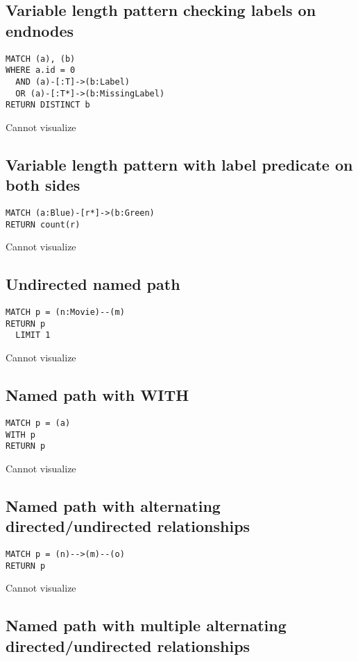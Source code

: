 \subsection{Variable length pattern checking labels on endnodes}

\begin{lstlisting}
MATCH (a), (b)
WHERE a.id = 0
  AND (a)-[:T]->(b:Label)
  OR (a)-[:T*]->(b:MissingLabel)
RETURN DISTINCT b
\end{lstlisting}

Cannot visualize
\subsection{Variable length pattern with label predicate on both sides}

\begin{lstlisting}
MATCH (a:Blue)-[r*]->(b:Green)
RETURN count(r)
\end{lstlisting}

Cannot visualize
\subsection{Undirected named path}

\begin{lstlisting}
MATCH p = (n:Movie)--(m)
RETURN p
  LIMIT 1
\end{lstlisting}

Cannot visualize
\subsection{Named path with WITH}

\begin{lstlisting}
MATCH p = (a)
WITH p
RETURN p
\end{lstlisting}

Cannot visualize
\subsection{Named path with alternating directed/undirected relationships}

\begin{lstlisting}
MATCH p = (n)-->(m)--(o)
RETURN p
\end{lstlisting}

Cannot visualize
\subsection{Named path with multiple alternating directed/undirected relationships}

